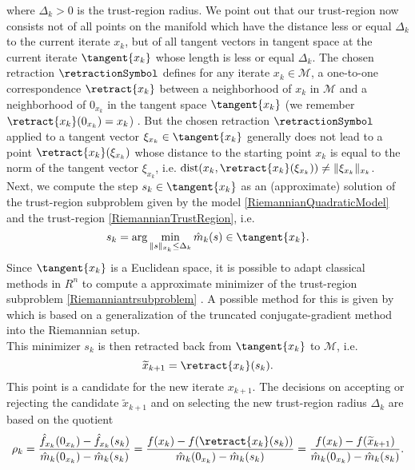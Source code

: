 where $\Delta_k > 0$ is the trust-region radius. We point out that our trust-region now consists not of all points on the manifold which have the distance less or equal $\Delta_k$ to the current iterate $x_k$, but of all tangent vectors in tangent space at the current iterate $\tangent{x_k}$ whose length is less or equal $\Delta_k$. The chosen retraction $\retractionSymbol$ defines for any iterate $x_k \in \mathcal{M}$, a one-to-one correspondence $\retract{x_k}$ between a neighborhood of $x_k$ in $\mathcal{M}$ and a neighborhood of $0_{x_k}$ in the tangent space $\tangent{x_k}$ (we remember $\retract{x_k}(0_{x_k}) = x_k$) \cite[p.~304]{AbsilBakerGallivan:2007}. But the chosen retraction $\retractionSymbol$ applied to a tangent vector $\xi_{x_k} \in \tangent{x_k}$ generally does not lead to a point $\retract{x_k}(\xi_{x_k})$ whose distance to the starting point $x_k$ is equal to the norm of the tangent vector $\xi_{x_k}$, i.e. $\operatorname{dist}(x_k, \retract{x_k}(\xi_{x_k})) \neq \lVert \xi_{x_k} \rVert_{x_k}$. \\
Next, we compute the step $s_k \in \tangent{x_k}$ as an (approximate) solution of the trust-region subproblem given by the model \cref{RiemannianQuadraticModel} and the trust-region \cref{RiemannianTrustRegion}, i.e.
\begin{equation}\label{Riemanniantrsubproblem}
    s_k = \arg \min_{\lVert s \rVert_{x_k} \leq \Delta_k} \hat{m}_k( s ) \in \tangent{x_k}.
\end{equation}
Since $\tangent{x_k}$ is a Euclidean space, it is possible to adapt classical methods in $R^n$ to compute a approximate minimizer of the trust-region subproblem \cref{Riemanniantrsubproblem} \cite[p.~304]{AbsilBakerGallivan:2007}. A possible method for this is given by \cite[Algorithm~11]{AbsilMahonySepulchre:2008} which is based on a generalization of the truncated conjugate-gradient method into the Riemannian setup. \\
This minimizer $s_k$ is then retracted back from $\tangent{x_k}$ to $\mathcal{M}$, i.e.
\begin{equation*}
    \widetilde{x}_{k+1} = \retract{x_k}(s_k).
\end{equation*}
This point is a candidate for the new iterate $x_{k+1}$. The decisions on accepting or rejecting the candidate $\widetilde{x}_{k+1}$ and on selecting the new trust-region radius $\Delta_k$ are based on the quotient
\begin{equation*}
    \rho_k = \frac{\hat{f}_{x_k}(0_{x_k}) - \hat{f}_{x_k}(s_k)}{\hat{m}_k(0_{x_k}) - \hat{m}_k(s_k)} = \frac{f(x_k) - f(\retract{x_k}(s_k))}{\hat{m}_k(0_{x_k}) - \hat{m}_k(s_k)} = \frac{f(x_k) - f(\widetilde{x}_{k+1})}{\hat{m}_k(0_{x_k}) - \hat{m}_k(s_k)}.
\end{equation*}
